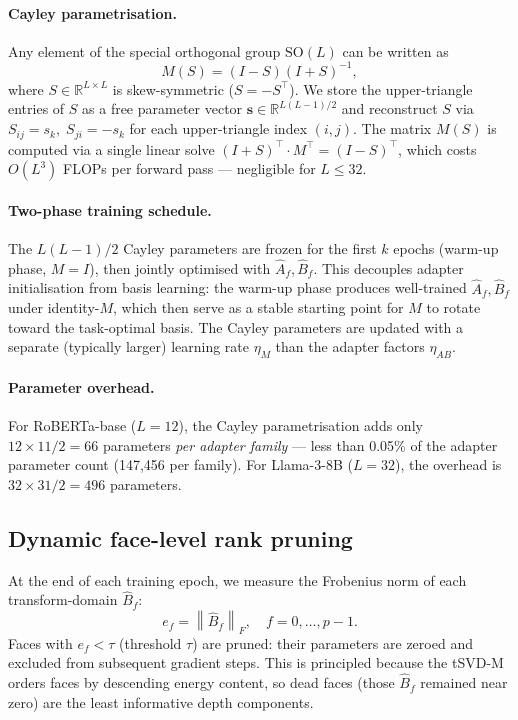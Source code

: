\documentclass{article}
\newcommand{\norm}[1]{\left\|#1\right\|}
\theoremstyle{plain}
\begin{document}
\paragraph{Cayley parametrisation.}
Any element of the special orthogonal group $\mathrm{SO}(L)$ can be written as
\begin{equation}
  M(S) = (I - S)(I + S)^{-1},
  \label{eq:cayley}
\end{equation}
where $S \in \mathbb{R}^{L \times L}$ is skew-symmetric ($S = -S^\top$).
We store the upper-triangle entries of $S$ as a free parameter vector
$\mathbf{s} \in \mathbb{R}^{L(L-1)/2}$ and reconstruct $S$ via
$S_{ij} = s_k,\; S_{ji} = -s_k$ for each upper-triangle index $(i,j)$.
The matrix $M(S)$ is computed via a single linear solve
$(I+S)^\top \cdot M^\top = (I-S)^\top$,
which costs $O(L^3)$ FLOPs per forward pass — negligible for $L \leq 32$.

\paragraph{Two-phase training schedule.}
The $L(L{-}1)/2$ Cayley parameters are frozen for the first $k$ epochs
(warm-up phase, $M = I$), then jointly optimised with $\hat{A}_f, \hat{B}_f$.
This decouples adapter initialisation from basis learning: the warm-up phase
produces well-trained $\hat{A}_f, \hat{B}_f$ under identity-$M$, which then
serve as a stable starting point for $M$ to rotate toward the task-optimal basis.
The Cayley parameters are updated with a separate (typically larger) learning rate
$\eta_M$ than the adapter factors $\eta_{AB}$.

\paragraph{Parameter overhead.}
For RoBERTa-base ($L = 12$), the Cayley parametrisation adds only
$12 \times 11 / 2 = 66$ parameters \emph{per adapter family} — less than 0.05\%
of the adapter parameter count (147,456 per family).
For Llama-3-8B ($L = 32$), the overhead is $32 \times 31 / 2 = 496$ parameters.

\subsection{Dynamic face-level rank pruning}
\label{sec:pruning}

At the end of each training epoch, we measure the Frobenius norm of each
transform-domain $\hat{B}_f$:
\begin{equation}
  e_f = \norm{\hat{B}_f}_F, \quad f = 0, \dots, p-1.
\end{equation}
Faces with $e_f < \tau$ (threshold $\tau$) are pruned: their parameters are zeroed
and excluded from subsequent gradient steps.
This is principled because the tSVD-M orders faces by descending energy content,
so dead faces (those $\hat{B}_f$ remained near zero) are the least informative
depth components.
\end{document}
